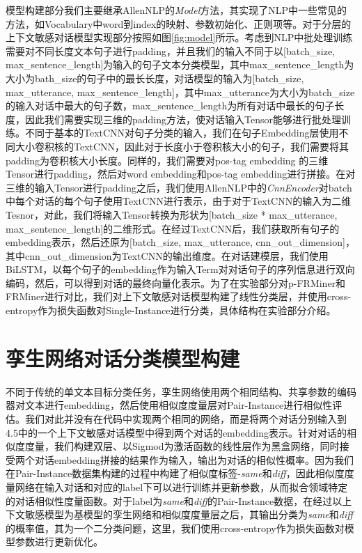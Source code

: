 模型构建部分我们主要继承AllenNLP的\textit{Model}方法，其实现了NLP中一些常见的方法，如Vocabulary中word到index的映射、参数初始化、正则项等。对于分层的上下文敏感对话模型实现部分按照如图\ref{fig:model}所示。考虑到NLP中批处理训练需要对不同长度文本句子进行padding，并且我们的输入不同于以[batch\_size, max\_sentence\_length]为输入的句子文本分类模型，其中max\_sentence\_length为大小为bath\_size的句子中的最长长度，对话模型的输入为[batch\_size, max\_utterance, max\_sentence\_length]，其中max\_utterance为大小为batch\_size的输入对话中最大的句子数，max\_sentence\_length为所有对话中最长的句子长度，因此我们需要实现三维的padding方法，使对话输入Tensor能够进行批处理训练。不同于基本的TextCNN对句子分类的输入，我们在句子Embedding层使用不同大小卷积核的TextCNN，因此对于长度小于卷积核大小的句子，我们需要将其padding为卷积核大小长度。同样的，我们需要对pos-tag embedding 的三维Tensor进行padding，然后对word embedding和pos-tag embedding进行拼接。在对三维的输入Tensor进行padding之后，我们使用AllenNLP中的\textit{CnnEncoder}对batch中每个对话的每个句子使用TextCNN进行表示，由于对于TextCNN的输入为二维Tesnor，对此，我们将输入Tensor转换为形状为[batch\_size * max\_utterance, max\_sentence\_length]的二维形式。在经过TextCNN后，我们获取所有句子的embedding表示，然后还原为[batch\_size, max\_utterance, cnn\_out\_dimension]，其中cnn\_out\_dimension为TextCNN的输出维度。在对话建模层，我们使用BiLSTM，以每个句子的embedding作为输入Term对对话句子的序列信息进行双向编码，然后，可以得到对话的最终向量化表示。为了在实验部分对p-FRMiner和FRMiner进行对比，我们对上下文敏感对话模型构建了线性分类层，并使用cross-entropy作为损失函数对Single-Instance进行分类，具体结构在实验部分介绍。

\section{孪生网络对话分类模型构建}
不同于传统的单文本目标分类任务，孪生网络使用两个相同结构、共享参数的编码器对文本进行embedding，然后使用相似度度量层对Pair-Instance进行相似性评估。我们对此并没有在代码中实现两个相同的网络，而是将两个对话分别输入到4.5中的一个上下文敏感对话模型中得到两个对话的embedding表示。针对对话的相似度度量，我们构建双层、以Sigmod为激活函数的线性层作为黑盒网络，同时接受两个对话embedding拼接的结果作为输入，输出为对话的相似性概率。因为我们在Pair-Instance数据集构建的过程中构建了相似度标签-\textit{same}和\textit{diff}，因此相似度度量网络在输入对话和对应的label下可以进行训练并更新参数，从而拟合领域特定的对话相似性度量函数。对于label为\textit{same}和\textit{diff}的Pair-Instance数据，在经过以上下文敏感模型为基模型的孪生网络和相似度度量层之后，其输出分类为\textit{same}和\textit{diff}的概率值，其为一个二分类问题，这里，我们使用cross-entropy作为损失函数对模型参数进行更新优化。


